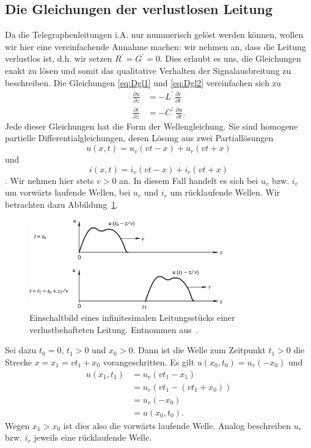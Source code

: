 \documentclass[paper=a4, parskip=half-, ngerman, fontsize=11pt]{scrreprt}
\begin{document}
\subsection{Die Gleichungen der verlustlosen Leitung}
Da die Telegraphenleitungen i.A. nur nummerisch gelöst werden können, wollen wir hier eine vereinfachende Annahme
machen: wir nehmen an, dass die Leitung verlustlos ist, d.h. wir setzen $R^{\prime} = G^{\prime} = 0$. Dies erlaubt es
uns, die Gleichungen exakt zu lösen und somit das qualitative Verhalten der Signalausbreitung zu beschreiben. Die
Gleichungen \eqref{eq:Dgl1} und \eqref{eq:Dgl2} vereinfachen sich zu
\begin{align}
    \frac{\partial u}{\partial z} &= - L^{\prime} \, \frac{\partial i}{\partial t} \label{eq:Dgl7} \\[1ex]
    \frac{\partial i}{\partial z} &= - C^{\prime} \, \frac{\partial u}{\partial t} \label{eq:Dgl8} .
\end{align}
Jede dieser Gleichungen hat die Form der Wellengleichung. Sie sind homogene partielle Differentialgleichungen, deren
Lösung aus zwei Partiallösungen \[ u(x, t) = u_{v}(v t - x) + u_{r}(v t + x) \] und \[ i(x, t) = i_{v}(v t - x) +
i_{r}(v t + x) \]. Wir nehmen hier stets $v > 0$ an. In diesem Fall handelt es sich bei $u_{v}$ bzw. $i_{v}$ um
vorwärts laufende Wellen, bei $u_{r}$ und $i_{r}$ um rücklaufende Wellen. Wir betrachten dazu
Abbildung~\ref{VorwaertsWelle}.
\begin{figure}[!h]
    \begin{center}
        \includegraphics[width=0.75\textwidth]{images/VorwaertsWelle.png}
        \caption{Einschaltbild eines infinitesimalen Leitungsstücks einer verlustbehafteten Leitung. Entnommen
            aus~\cite{LeitungenUndFilter}.}
        \label{VorwaertsWelle}
    \end{center}
\end{figure}
Sei dazu $t_{0} = 0$, $t_{1} > 0$ und $x_{0} > 0$. Dann ist die Welle zum Zeitpunkt $t_{1} > 0$ die Strecke $x = x_{1}
= v t_{1} + x_{0}$ vorangeschritten. Es gilt $u(x_{0}, t_{0}) = u_{v}(-x_{0})$ und
\begin{align*}
    u(x_{1}, t_{1}) &= u_{v}(v t_{1} - x_{1}) \\
                    &= u_{v}(v t_{1} - (v t_{1} + x_{0})) \\
                    &= u_{v}(- x_{0}) \\
                    &= u(x_{0}, t_{0}).
\end{align*}
Wegen $x_{1} > x_{0}$ ist dies also die vorwärts laufende Welle. Analog beschreiben $u_{r}$ bzw. $i_{r}$ jeweils eine
rücklaufende Welle.
\end{document}
